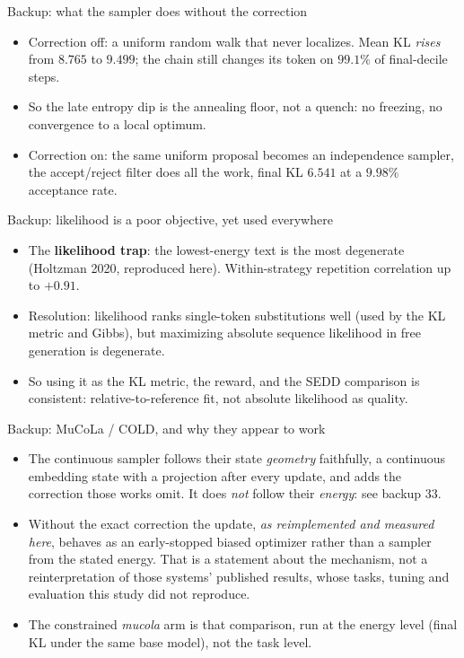 \documentclass{beamer}
\begin{document}
\begin{frame}[noframenumbering]{Backup: what the sampler does without the correction}
  \small
  \begin{itemize}
    \item Correction off: a uniform random walk that never localizes. Mean KL \emph{rises} from $8.765$ to $9.499$; the chain still changes its token on $99.1\%$ of final-decile steps.
    \item So the late entropy dip is the annealing floor, not a quench: no freezing, no convergence to a local optimum.
    \item Correction on: the same uniform proposal becomes an independence sampler, the accept/reject filter does all the work, final KL $6.541$ at a $9.98\%$ acceptance rate.
  \end{itemize}
\end{frame}

\begin{frame}[noframenumbering]{Backup: likelihood is a poor objective, yet used everywhere}
  \small
  \begin{itemize}
    \item The \textbf{likelihood trap}: the lowest-energy text is the most degenerate (Holtzman 2020, reproduced here). Within-strategy repetition correlation up to $+0.91$.
    \item Resolution: likelihood ranks single-token substitutions well (used by the KL metric and Gibbs), but maximizing absolute sequence likelihood in free generation is degenerate.
    \item So using it as the KL metric, the reward, and the SEDD comparison is consistent: relative-to-reference fit, not absolute likelihood as quality.
  \end{itemize}
\end{frame}

\begin{frame}[noframenumbering]{Backup: MuCoLa / COLD, and why they appear to work}
  \small
  \begin{itemize}
    \item The continuous sampler follows their state \emph{geometry} faithfully, a continuous embedding state with a projection after every update, and adds the correction those works omit. It does \emph{not} follow their \emph{energy}: see backup 33.
    \item Without the exact correction the update, \emph{as reimplemented and measured here}, behaves as an early-stopped biased optimizer rather than a sampler from the stated energy. That is a statement about the mechanism, not a reinterpretation of those systems' published results, whose tasks, tuning and evaluation this study did not reproduce.
    \item The constrained \emph{mucola} arm is that comparison, run at the energy level (final KL under the same base model), not the task level.
  \end{itemize}
\end{frame}
\end{document}
